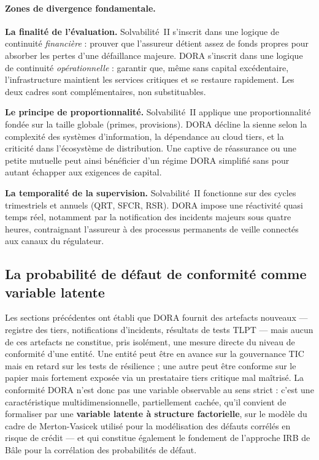 \documentclass[11pt,a4paper]{article}
\theoremstyle{navystyle}
\theoremstyle{navydef}
\begin{document}
\paragraph{Zones de divergence fondamentale.}
\textbf{La finalité de l'évaluation.} Solvabilité~II s'inscrit dans une logique de
continuité \emph{financière} : prouver que l'assureur détient assez de fonds propres pour
absorber les pertes d'une défaillance majeure. DORA s'inscrit dans une logique de
continuité \emph{opérationnelle} : garantir que, même sans capital excédentaire,
l'infrastructure maintient les services critiques et se restaure rapidement. Les deux
cadres sont complémentaires, non substituables.

\textbf{Le principe de proportionnalité.} Solvabilité~II applique une proportionnalité
fondée sur la taille globale (primes, provisions). DORA décline la sienne selon la
complexité des systèmes d'information, la dépendance au cloud tiers, et la criticité dans
l'écosystème de distribution. Une captive de réassurance ou une petite mutuelle peut ainsi
bénéficier d'un régime DORA simplifié sans pour autant échapper aux exigences de capital.

\textbf{La temporalité de la supervision.} Solvabilité~II fonctionne sur des cycles
trimestriels et annuels (QRT, SFCR, RSR). DORA impose une réactivité quasi temps réel,
notamment par la notification des incidents majeurs sous quatre heures, contraignant
l'assureur à des processus permanents de veille connectés aux canaux du régulateur.

\subsection{La probabilité de défaut de conformité comme variable latente}

Les sections précédentes ont établi que DORA fournit des artefacts nouveaux ---
registre des tiers, notifications d'incidents, résultats de tests TLPT ---
mais aucun de ces artefacts ne constitue, pris isolément, une mesure directe
du niveau de conformité d'une entité. Une entité peut être en avance sur la
gouvernance TIC mais en retard sur les tests de résilience ; une autre peut
être conforme sur le papier mais fortement exposée via un prestataire tiers
critique mal maîtrisé. La conformité DORA n'est donc pas une variable
observable au sens strict : c'est une caractéristique multidimensionnelle,
partiellement cachée, qu'il convient de formaliser par une \textbf{variable
latente à structure factorielle}, sur le modèle du cadre de Merton-Vasicek
utilisé pour la modélisation des défauts corrélés en risque de crédit --- et
qui constitue également le fondement de l'approche IRB de Bâle pour la
corrélation des probabilités de défaut.
\end{document}
